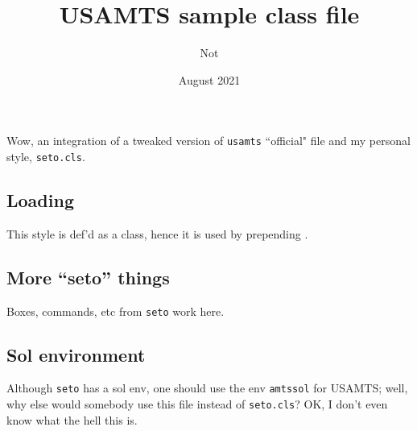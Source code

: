 \documentclass{amts}
\title{USAMTS sample class file}
\author{Not \rname}
\date{August 2021}
\begin{document}
\maketitle
Wow, an integration of a tweaked version of \texttt{usamts} ``official" file and my personal style, \texttt{seto.cls}.
\toc
\begin{amtssol}
\subsection{Loading}
This style is def'd as a class, hence it is used by prepending .
\subsection{More ``seto'' things}
Boxes, commands, etc from \texttt{seto} work here.
\subsection{Sol environment}
Although \texttt{seto} has a sol env, one should use the env \texttt{amtssol} for USAMTS; well, why else would  somebody use this file instead of \texttt{seto.cls}?
OK, I don't even know what the hell this is.
\end{amtssol}
\end{document}
